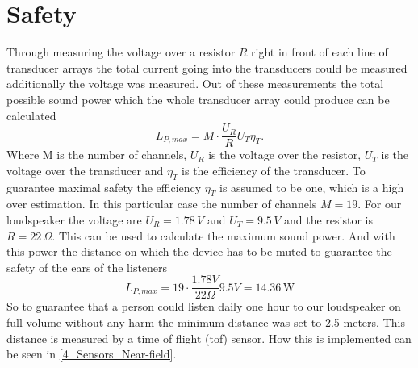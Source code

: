 \newpage
\section{Safety}
Through measuring the voltage over a resistor $R$ right in front of each line of transducer arrays the total current going into the transducers could be measured additionally the voltage was measured. Out of these measurements the total possible sound power which the whole transducer array could produce can be calculated
\begin{equation}
    L_{P,max} = M \cdot \frac{U_R}{R} U_{T}\eta_{T}.
\end{equation}
Where M is the number of channels, $U_R$ is the voltage over the resistor, $U_T$ is the voltage over the transducer and $\eta_{T}$ is the efficiency of the transducer. To guarantee maximal safety the efficiency $\eta_{T}$ is assumed to be one, which is a high over estimation.
In this particular case the number of channels $M = 19$. For our loudspeaker the voltage are $U_R = 1.78 \, V$ and $U_T = 9.5 \, V $ and the resistor is $R = 22 \, \Omega$. This can be used to calculate the maximum sound power. And with this power the distance on which the device has to be muted to guarantee the safety of the ears of the listeners
\begin{equation}
     L_{P,max} = 19 \cdot \frac{1.78 V}{22 \Omega} 9.5 V = 14.36 \, \text{W}
\end{equation}
So to guarantee that a person could listen daily one hour to our loudspeaker on full volume without any harm the minimum distance was set to 2.5 meters. This distance is measured by a time of flight (\acrshort{tof}) sensor. How this is implemented can be seen in \ref{4_Sensors_Near-field}.     
\newpage